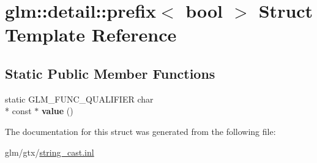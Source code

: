 \hypertarget{structglm_1_1detail_1_1prefix_3_01bool_01_4}{\section{glm\-:\-:detail\-:\-:prefix$<$ bool $>$ Struct Template Reference}
\label{structglm_1_1detail_1_1prefix_3_01bool_01_4}
}
\subsection*{Static Public Member Functions}
\begin{DoxyCompactItemize}
\item 
\hypertarget{structglm_1_1detail_1_1prefix_3_01bool_01_4_ab6d6392aa906c684f1abdda98830adad}{static G\-L\-M\-\_\-\-F\-U\-N\-C\-\_\-\-Q\-U\-A\-L\-I\-F\-I\-E\-R char \\*
const $\ast$ {\bfseries value} ()}\label{structglm_1_1detail_1_1prefix_3_01bool_01_4_ab6d6392aa906c684f1abdda98830adad}

\end{DoxyCompactItemize}


The documentation for this struct was generated from the following file\-:\begin{DoxyCompactItemize}
\item 
glm/gtx/\hyperlink{string__cast_8inl}{string\-\_\-cast.\-inl}\end{DoxyCompactItemize}

